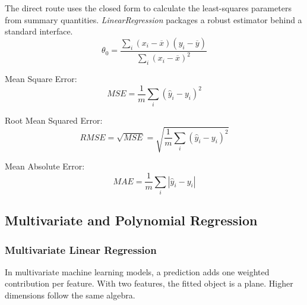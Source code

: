 The direct route uses the closed form to calculate the least-squares parameters from summary quantities.
\textit{LinearRegression} packages a robust estimator behind a standard interface.
\begin{equation}
    \theta_0 = \frac{\sum_i (x_i - \overline{x})(y_i - \overline{y})}{\sum_i (x_i-\overline{x})^2}
\end{equation}

\noindent Mean Square Error:
\begin{equation}
    MSE = \frac{1}{m}\sum_{i} (\hat{y}_i - y_i)^2
\end{equation}

\noindent Root Mean Squared Error:
\begin{equation}
    RMSE = \sqrt{MSE} = \sqrt{\frac{1}{m}\sum_{i} (\hat{y}_i - y_i)^2}
\end{equation}

\noindent Mean Absolute Error:
\begin{equation}
    MAE = \frac{1}{m} \sum_i |\hat{y}_i - y_i|
\end{equation}

\noindent{} 



\subsection{Multivariate and Polynomial Regression}

\subsubsection{Multivariate Linear Regression}

In multivariate machine learning models, a prediction adds one weighted contribution per feature.
With two features, the fitted object is a plane.
Higher dimensions follow the same algebra.

